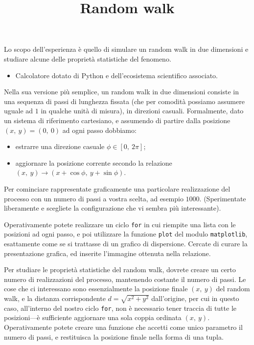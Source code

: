 \documentclass{lab1-article}
\title{Random walk}
\begin{document}
\begin{article}

\maketitle

\secsummary
Lo scopo dell'esperienza \`e quello di simulare un random walk in due dimensioni
e studiare alcune delle propriet\`a statistiche del fenomeno.

\secmaterials

\begin{itemize}
    \item Calcolatore dotato di Python e dell'ecosistema scientifico associato.
\end{itemize}

\secmeasurements

Nella sua versione pi\`u semplice, un random walk in due dimensioni consiste in
una sequenza di passi di lunghezza fissata (che per comodit\`a possiamo assumere
uguale ad $1$ in qualche unit\`a di misura), in direzioni casuali.
Formalmente, dato un sistema di riferimento cartesiano, e assumendo di partire
dalla posizione $(x,~y) = (0,~0)$ ad ogni passo dobbiamo:
\begin{itemize}
    \item estrarre una direzione casuale $\phi \in [0,~2\pi]$;
    \item aggiornare la posizione corrente secondo la relazione
        $(x,~y) \rightarrow (x + \cos\phi,~y + \sin\phi)$.
\end{itemize}



Per cominciare rappresentate graficamente una particolare realizzazione del processo
con un numero di passi a vostra scelta, ad esempio $1000$. (Sperimentate liberamente
e scegliete la configurazione che vi sembra pi\`u interessante).

Operativamente potete realizzare un ciclo \texttt{for} in cui riempite una lista
con le posizioni ad ogni passo, e poi utilizzare la funzione \texttt{plot} del modulo
\texttt{matplotlib}, esattamente come se si trattasse di un grafico di dispersione.
Cercate di curare la presentazione grafica, ed inserite l'immagine ottenuta nella
relazione.



Per studiare le propriet\`a statistiche del random walk, dovrete creare un certo
numero di realizzazioni del processo, mantenendo costante il numero di passi.
Le cose che ci interessano sono essenzialmente la posizione finale $(x,~y)$ del
random walk, e la distanza corrispondente $d = \sqrt{x^2 + y^2}$ dall'origine, per
cui in questo caso, all'interno del nostro ciclo \texttt{for}, non \`e necessario
tener traccia di tutte le posizioni---\`e sufficiente aggiornare una sola coppia
ordinata $(x,~y)$. Operativamente potete creare una funzione che accetti come unico
parametro il numero di passi, e restituisca la posizione finale nella forma di una
tupla.


\end{article}
\end{document}
